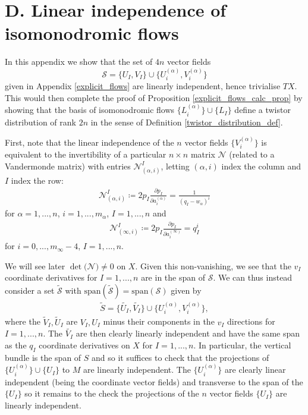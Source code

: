 \documentclass[a4paper,12pt,reqno]{amsart}
\numberwithin{equation}{section}
\numberwithin{counter2}{section}
\begin{document}
 \section{D.  Linear independence of isomonodromic flows}\label{linear_independence_appendix}
 In this appendix we show that the set of $4n$ vector fields
 $$\mathcal{S} = \{U_I,V_I\} \cup \{U_i^{(\alpha)},V_i^{(\alpha)}\} $$ 
given in Appendix \ref{explicit_flows} are linearly independent,  hence trivialise $TX$.  This would then complete the proof of Proposition \ref{explicit_flows_calc_prop} by showing that the basis of isomonodromic flows $\{L_i^{(\alpha)}\} \cup \{L_I\}$ define a twistor distribution of rank $2n$ in the sense of Definition \ref{twistor_distribution_def}.  \par 
First,  note that the linear independence of the $n$ vector fields $\{V_{i}^{(\alpha)}\}$
    is equivalent to the invertibility of a particular $n \times n$ matrix $\mathcal{N}$ (related to a Vandermonde matrix)
with entries $\mathcal{N}^I_{(\alpha,i)}$,  letting $(\alpha, i)$ index the column and $I$ index the row:
\begin{align}
\mathcal{N}_{(\alpha,i)}^I \coloneqq  2p_I\frac{\partial p_I}{\partial a_{i}^{(\alpha)}} = \frac{1}{(q_I-w_\alpha)^i}
\end{align}
for $\alpha = 1,...,n$,  $i = 1,...,m_\alpha$,  $I = 1,...,n$ and 
\begin{align}
\mathcal{N}_{(\infty,i)}^I \coloneqq 2p_I\frac{\partial p_I}{\partial a_{i}^{(\infty)}} = q_I^i
\end{align}
for $i = 0,...,m_\infty - 4$,  $I = 1,...,n$.  \par 
We will see later $\operatorname{det}(\mathcal{N)} \ne 0$ on $X$.  
Given this non-vanishing,  we see that the $v_I$ coordinate derivatives for $I = 1,...,n$ are in the span of $\mathcal{S}$.  We can thus instead consider a set $\tilde{\mathcal{S}}$ with $\text{span}(\tilde{\mathcal{S}}) = \text{span}(\mathcal{S})$ given by 
\begin{align}
\tilde{S} = \{\tilde{U_I},\tilde{V_I}\} \cup \{U_i^{(\alpha)},V_i^{(\alpha)}\},  
\end{align}
where the $\tilde{V}_I,  \tilde{U}_I$ are $V_I,  U_I$ minus their components in the $v_I$ directions for $I = 1,...,n$.  The $\tilde{V_I}$ are then clearly linearly independent and have the same span as the $q_I$ coordinate derivatives on $X$ for $I = 1,...,n$.  In particular,  the vertical bundle is the span of $S$ and so it suffices to check that the projections of $\{U_{i}^{(\alpha)}\} \cup \{U_I\}$ to $M$ are linearly independent.  The $\{U_{i}^{(\alpha)}\}$ are clearly linear independent (being the coordinate vector fields) and transverse to the span of the $\{U_I\}$ so it remains to the check the projections of the $n$ vector fields $\{U_I\}$ are linearly independent.  \par
\end{document}
